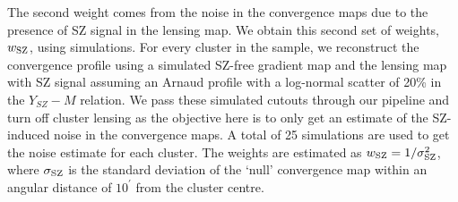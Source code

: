 The second %
 weight comes from the noise in the convergence maps due to the presence of SZ signal in the lensing map.%
We obtain this second set of weights, $w_{\rm SZ}$, using simulations. 
For every cluster in the sample, we reconstruct the convergence profile using a simulated SZ-free gradient map and the lensing map with SZ signal assuming an Arnaud profile \citep{arnaud10} with a log-normal scatter of 20\% in the $Y_{SZ}-M$ relation. 
We pass these simulated cutouts through our pipeline and turn off cluster lensing as the objective here is to only get an estimate of the SZ-induced noise in the convergence maps.
A total of 25 simulations are used to get the noise estimate for each cluster.
The weights are estimated as
$w_{\rm SZ} = 1/\sigma_{\rm SZ}^{2}$, where $\sigma_{\rm SZ}$ is the standard deviation of the `null' convergence map within an angular distance of $10^{\prime}$ from the cluster centre.

